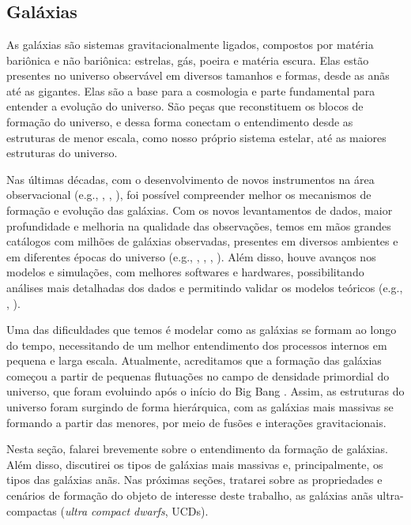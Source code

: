\setcounter{page}{0}
\chapter{\chapternameintro} \label{introduction}

\section{Galáxias}\label{sec:Galaxias}
As galáxias são sistemas gravitacionalmente ligados, compostos por matéria bariônica e não bariônica: estrelas, gás, poeira e matéria escura. Elas estão presentes no universo observável em diversos tamanhos e formas, desde as anãs até as gigantes. Elas são a base para a cosmologia e parte fundamental para entender a evolução do universo. São peças que reconstituem os blocos de formação do universo, e dessa forma conectam o entendimento desde as estruturas de menor escala, como nosso próprio sistema estelar, até as maiores estruturas do universo.

Nas últimas décadas, com o desenvolvimento de novos instrumentos na área observacional (e.g., \citealp{hubble_classification_1926}, \citealp{VLT_2010}, \citealp{JWT_2006}), foi possível compreender melhor os mecanismos de formação e evolução das galáxias. Com os novos levantamentos de dados, maior profundidade e melhoria na qualidade das observações, temos em mãos grandes catálogos com milhões de galáxias observadas, presentes em diversos ambientes e em diferentes épocas do universo (e.g., \citealp{SDSS_2000}, \citealp{COSMOS_2007}, \citealp{DES_2018}, \citealp{oliveira2019splus}). Além disso, houve avanços nos modelos e simulações, com melhores softwares e hardwares, possibilitando análises mais detalhadas dos dados e permitindo validar os modelos teóricos (e.g., \citealp{Vogelsberger_2014}, \citealp{EAGLE_2015}).

Uma das dificuldades que temos é modelar como as galáxias se formam ao longo do tempo, necessitando de um melhor entendimento dos processos internos em pequena e larga escala. Atualmente, acreditamos que a formação das galáxias começou a partir de pequenas flutuações no campo de densidade primordial do universo, que foram evoluindo após o início do Big Bang \citep{liddle_1999}. Assim, as estruturas do universo foram surgindo de forma hierárquica, com as galáxias mais massivas se formando a partir das menores, por meio de fusões e interações gravitacionais.

Nesta seção, falarei brevemente sobre o entendimento da formação de galáxias. Além disso, discutirei os tipos de galáxias mais massivas e, principalmente, os tipos das galáxias anãs. Nas próximas seções, tratarei sobre as propriedades e cenários de formação do objeto de interesse deste trabalho, as galáxias anãs ultra-compactas ({\it ultra compact dwarfs}, UCDs).


